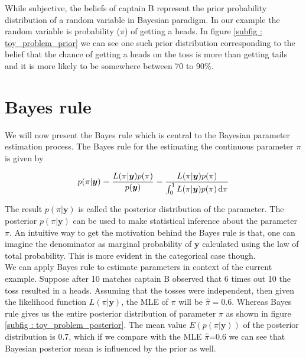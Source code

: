 While subjective, the beliefs of captain B represent the prior probability distribution of a random variable in Bayesian paradigm. In our example the random variable is probability ($\pi$) of getting a heads. In figure \ref{subfig : toy_problem_prior} we can see one such prior distribution corresponding to the belief that the chance of getting a heads on the toss is more than getting tails and it is more likely to be somewhere between 70 to 90\%.

\section{Bayes rule}
\label{sec : bayes_rule}
We will now present the Bayes rule which is central to the Bayesian parameter estimation process. The Bayes rule for the estimating the continuous parameter $\pi$ is given by

\begin{equation}
\label{eq : bayes_rule}
p(\pi|\boldsymbol{y}) = \dfrac{L(\pi|\boldsymbol{y})p(\pi)}{p(\boldsymbol{y})} = \dfrac{L(\pi|\boldsymbol{y})p(\pi)}{\int_{0}^{1}L(\pi|\boldsymbol{y})p(\pi)\mathop{}\!\mathrm{d}\pi}
\end{equation}

The result $p(\pi|\boldsymbol{y})$ is called the posterior distribution of the parameter. The posterior $p(\pi|\boldsymbol{y})$ can be used to make statistical inference about the parameter $\pi$. An intuitive way to get the motivation behind the Bayes rule is that, one can imagine the denominator as marginal probability of $\boldsymbol{y}$ calculated using the law of total probability. This is more evident in the categorical case though.\\

We can apply Bayes rule to estimate parameters in context of the current example. Suppose after 10 matches captain B observed that 6 times out 10 the toss resulted in a heads. Assuming that the tosses were independent, then given the likelihood function $L(\pi|\boldsymbol{y})$, the MLE of $\pi$ will be $\hat{\pi} = 0.6$. Whereas Bayes rule gives us the entire posterior distribution of parameter $\pi$ as shown in figure \ref{subfig : toy_problem_posterior}. The mean value $E(p(\pi|\boldsymbol{y}))$ of the posterior distribution is 0.7, which if we compare with the MLE $\hat{\pi}$=0.6 we can see that Bayesian posterior mean is influenced by the prior as well.

